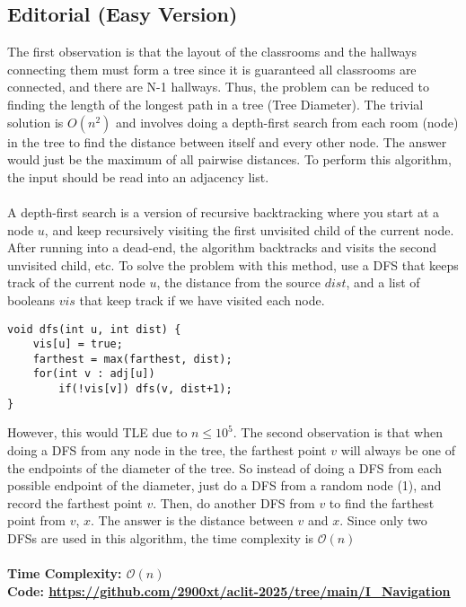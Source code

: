 \documentclass{article}
\newcommand{\link}[1]{\textcolor{blue!50!black}{\uline{\url{#1}}}}
\begin{document}
\subsection{Editorial (Easy Version)}
The first observation is that the layout of the classrooms and the hallways connecting them must form a tree since it is guaranteed all classrooms are connected, and there are N-1 hallways. Thus, the problem can be reduced to finding the length of the longest path in a tree (Tree Diameter). The trivial solution is $O(n^2)$ and involves doing a depth-first search from each room (node) in the tree to find the distance between itself and every other node. The answer would just be the maximum of all pairwise distances. To perform this algorithm, the input should be read into an adjacency list.
\\\\A depth-first search is a version of recursive backtracking where you start at a node $u$, and keep recursively visiting the first unvisited child of the current node. After running into a dead-end, the algorithm backtracks and visits the second unvisited child, etc. To solve the problem with this method, use a DFS that keeps track of the current node $u$, the distance from the source $dist$, and a list of booleans $vis$ that keep track if we have visited each node.
\begin{lstlisting}
void dfs(int u, int dist) {
    vis[u] = true;
    farthest = max(farthest, dist);
    for(int v : adj[u]) 
        if(!vis[v]) dfs(v, dist+1); 
}
\end{lstlisting}
However, this would TLE due to $n \leq 10^5$. The second observation is that when doing a DFS from any node in the tree, the farthest point $v$ will always be one of the endpoints of the diameter of the tree. So instead of doing a DFS from each possible endpoint of the diameter, just do a DFS from a random node (1), and record the farthest point $v$. Then, do another DFS from $v$ to find the farthest point from $v$, $x$. The answer is the distance between $v$ and $x$. Since only two DFSs are used in this algorithm, the time complexity is $\mathcal{O}(n)$
\\\\
\textbf{Time Complexity: $\mathcal{O}(n)$}\\
\textbf{Code: \link{https://github.com/2900xt/aclit-2025/tree/main/I_Navigation}}
\newpage
\end{document}
